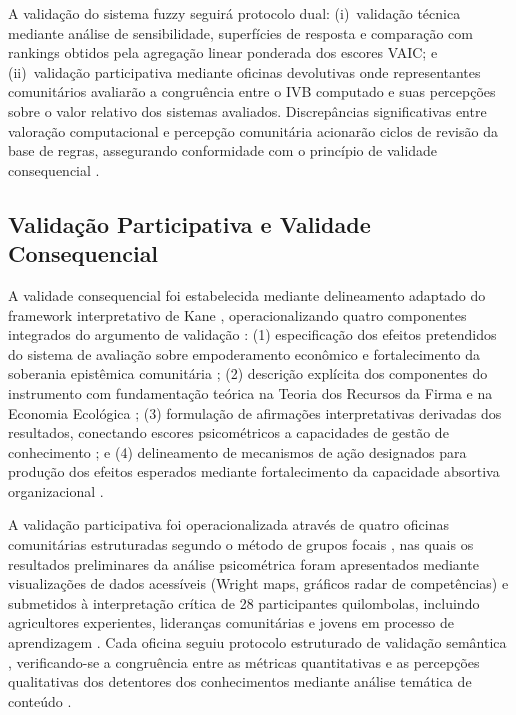A validação do sistema fuzzy seguirá protocolo dual: (i)~validação técnica mediante análise de sensibilidade, superfícies de resposta e comparação com rankings obtidos pela agregação linear ponderada dos escores VAIC; e (ii)~validação participativa mediante oficinas devolutivas onde representantes comunitários avaliarão a congruência entre o IVB computado e suas percepções sobre o valor relativo dos sistemas avaliados. Discrepâncias significativas entre valoração computacional e percepção comunitária acionarão ciclos de revisão da base de regras, assegurando conformidade com o princípio de validade consequencial \cite{Messick1995}.


\subsection{Validação Participativa e Validade Consequencial}

A validade consequencial foi estabelecida mediante delineamento adaptado do framework interpretativo de Kane \cite{Kane2013}, operacionalizando quatro componentes integrados do argumento de validação \cite{Kane2006}: (1) especificação dos efeitos pretendidos do sistema de avaliação sobre empoderamento econômico e fortalecimento da soberania epistêmica comunitária \cite{Messick1995}; (2) descrição explícita dos componentes do instrumento com fundamentação teórica na Teoria dos Recursos da Firma \cite{Barney1991} e na Economia Ecológica \cite{Costanza1997}; (3) formulação de afirmações interpretativas derivadas dos resultados, conectando escores psicométricos a capacidades de gestão de conhecimento \cite{Shavelson2009}; e (4) delineamento de mecanismos de ação designados para produção dos efeitos esperados mediante fortalecimento da capacidade absortiva organizacional \cite{CohenLevinthal1990}.

A validação participativa foi operacionalizada através de quatro oficinas comunitárias estruturadas segundo o método de grupos focais \cite{Krueger2014}, nas quais os resultados preliminares da análise psicométrica foram apresentados mediante visualizações de dados acessíveis (Wright maps, gráficos radar de competências) e submetidos à interpretação crítica de 28 participantes quilombolas, incluindo agricultores experientes, lideranças comunitárias e jovens em processo de aprendizagem \cite{FalsBorda1991}. Cada oficina seguiu protocolo estruturado de validação semântica \cite{Pasquali2010}, verificando-se a congruência entre as métricas quantitativas e as percepções qualitativas dos detentores dos conhecimentos mediante análise temática de conteúdo \cite{Braun2006}.

